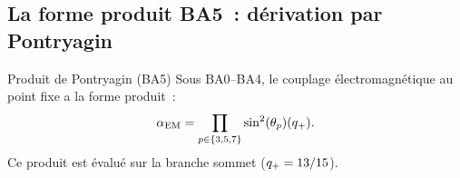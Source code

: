 \documentclass[12pt,a4paper]{article}
\begin{document}
\subsection{La forme produit BA5~: dérivation par Pontryagin}
\label{sec:ch9_BA5}

\begin{thmbox}{Produit de Pontryagin (BA5)}\mTHM
\label{thm:BA5}
Sous BA0--BA4, le couplage électromagnétique au point fixe a la
forme produit~:
\begin{equation}
  \alpha_{\mathrm{EM}} = \prod_{p \in \{3,5,7\}} \sin^2(\theta_{p})(q_{+}).
  \label{eq:BA5}
\end{equation}
Ce produit est évalué sur la branche sommet ($q_{+} = 13/15$).
\end{thmbox}
\end{document}
